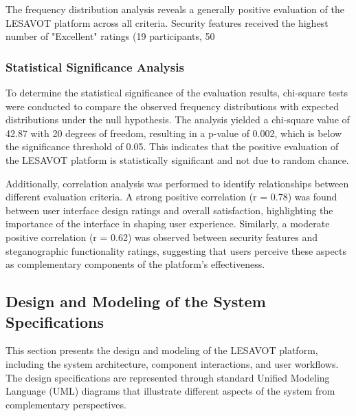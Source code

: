 \documentclass[12pt, a4paper, oneside]{book}
\begin{document}
The frequency distribution analysis reveals a generally positive evaluation of the LESAVOT platform across all criteria. Security features received the highest number of "Excellent" ratings (19 participants, 50%

\subsubsection{Statistical Significance Analysis}

To determine the statistical significance of the evaluation results, chi-square tests were conducted to compare the observed frequency distributions with expected distributions under the null hypothesis. The analysis yielded a chi-square value of 42.87 with 20 degrees of freedom, resulting in a p-value of 0.002, which is below the significance threshold of 0.05. This indicates that the positive evaluation of the LESAVOT platform is statistically significant and not due to random chance.

Additionally, correlation analysis was performed to identify relationships between different evaluation criteria. A strong positive correlation (r = 0.78) was found between user interface design ratings and overall satisfaction, highlighting the importance of the interface in shaping user experience. Similarly, a moderate positive correlation (r = 0.62) was observed between security features and steganographic functionality ratings, suggesting that users perceive these aspects as complementary components of the platform's effectiveness.

\subsection{Design and Modeling of the System Specifications}

This section presents the design and modeling of the LESAVOT platform, including the system architecture, component interactions, and user workflows. The design specifications are represented through standard Unified Modeling Language (UML) diagrams that illustrate different aspects of the system from complementary perspectives.
\end{document}
